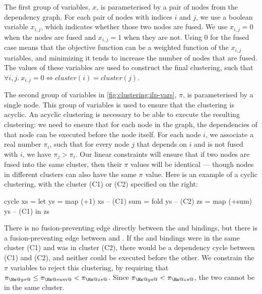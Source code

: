 
The first group of variables, $x$, is parameterised by a pair of nodes from the dependency graph.
For each pair of nodes with indices $i$ and $j$, we use a boolean variable $x_{i,j}$, which indicates whether those two nodes are fused.
We use $x_{i,j} = 0$ when the nodes are fused and $x_{i,j} = 1$ when they are not.
Using $0$ for the fused case means that the objective function can be a weighted function of the $x_{i,j}$ variables, and minimizing it tends to increase the number of nodes that are fused.
The values of these variables are used to construct the final clustering, such that $\forall i,j.\ x_{i,j} = 0 \iff \mathit{cluster}(i) = \mathit{cluster}(j)$.

The second group of variables in \cref{fig:clustering:ilp-vars}, $\pi$, is parameterised by a single node.
This group of variables is used to ensure that the clustering is acyclic.
An acyclic clustering is necessary to be able to execute the resulting clustering: we need to ensure that for each node in the graph, the dependencies of that node can be executed before the node itself.
For each node $i$, we associate a real number $\pi_i$, such that for every node $j$ that depends on $i$ and is not fused with $i$, we have $\pi_j > \pi_i$.
Our linear constraints will ensure that if two nodes are fused into the same cluster, then their $\pi$ values will be identical --- though nodes in different clusters can also have the same $\pi$ value.
Here is an example of a cyclic clustering, with the cluster (C1) or (C2) specified on the right:
\begin{haskell}
  cycle xs  = let ys  = map (+1) xs     -- (C1)
                  sum = fold ys         -- (C2)
                  zs  = map (+sum) ys   -- (C1)
              in  zs
\end{haskell}

There is no fusion-preventing edge directly between the \Hs@ys@ and \Hs@zs@ bindings, but there is a fusion-preventing edge between \Hs@sum@ and \Hs@zs@.
If the \Hs@ys@ and \Hs@zs@ bindings were in the same cluster (C1) and \Hs@sum@ was in cluster (C2), there would be a dependency cycle between (C1) and (C2), and neither could be executed before the other.
We constrain the $\pi$ variables to reject this clustering, by requiring that $\pi_{\Hs@ys@} \le \pi_{\Hs@sum@} < \pi_{\Hs@zs@}$.
Since $\pi_{\Hs@ys@} < \pi_{\Hs@zs@}$, the two cannot be in the same cluster.

